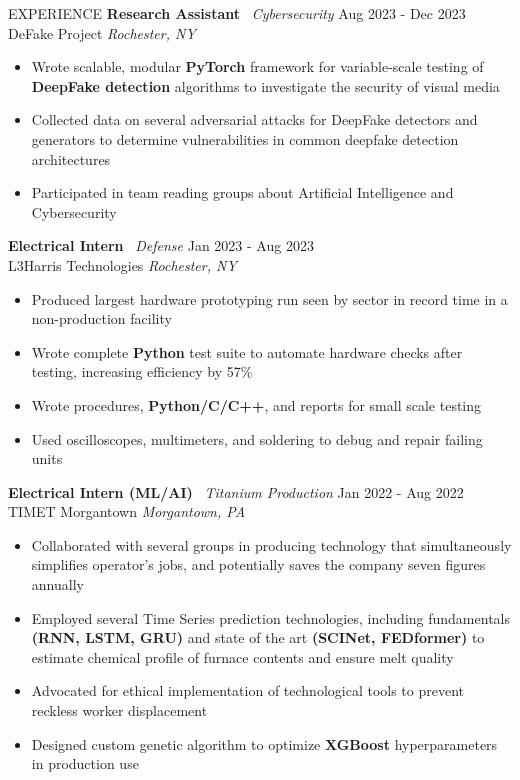 \documentclass{resume} %
\begin{document}
\begin{rSection}{EXPERIENCE}
\textbf{Research Assistant} \textbar\ \textit{Cybersecurity} \hfill Aug 2023 - Dec 2023\\
DeFake Project \hfill \textit{Rochester, NY}
\begin{itemize}
\itemsep-3pt {}
    \item Wrote scalable, modular \textbf{PyTorch} framework for variable-scale testing of \textbf{DeepFake detection} algorithms to investigate the security of visual media
    \item Collected data on several adversarial attacks for DeepFake detectors and generators to determine vulnerabilities in common deepfake detection architectures
    \item Participated in team reading groups about Artificial Intelligence and Cybersecurity
\end{itemize}

\textbf{Electrical Intern} \textbar\ \textit{Defense} \hfill Jan 2023 - Aug 2023\\
L3Harris Technologies \hfill \textit{Rochester, NY}
\begin{itemize}
\itemsep-3pt {}
    \item Produced largest hardware prototyping run seen by sector in record time in a non-production facility
    \item Wrote complete \textbf{Python} test suite to automate hardware checks after testing, increasing efficiency by 57\%
    \item Wrote procedures, \textbf{Python/C/C++}, and reports for small scale testing
    \item Used oscilloscopes, multimeters, and soldering to debug and repair failing units
\end{itemize}

    \textbf{Electrical Intern (ML/AI)} \textbar\ \textit{Titanium Production} \hfill Jan 2022 - Aug 2022\\
TIMET Morgantown \hfill \textit{Morgantown, PA}
\begin{itemize}
    \itemsep-3pt {}
    \item Collaborated with several groups in producing technology that simultaneously simplifies operator’s jobs, and potentially saves the company seven figures annually
    \item Employed several Time Series prediction technologies, including fundamentals \textbf{(RNN, LSTM, GRU)} and state of the art \textbf{(SCINet, FEDformer)} to estimate chemical profile of furnace contents and ensure melt quality
    \item Advocated for ethical implementation of technological tools to prevent reckless worker displacement
    \item Designed custom genetic algorithm to optimize \textbf{XGBoost} hyperparameters in production use
\end{itemize}

\end{rSection} 
\end{document}
